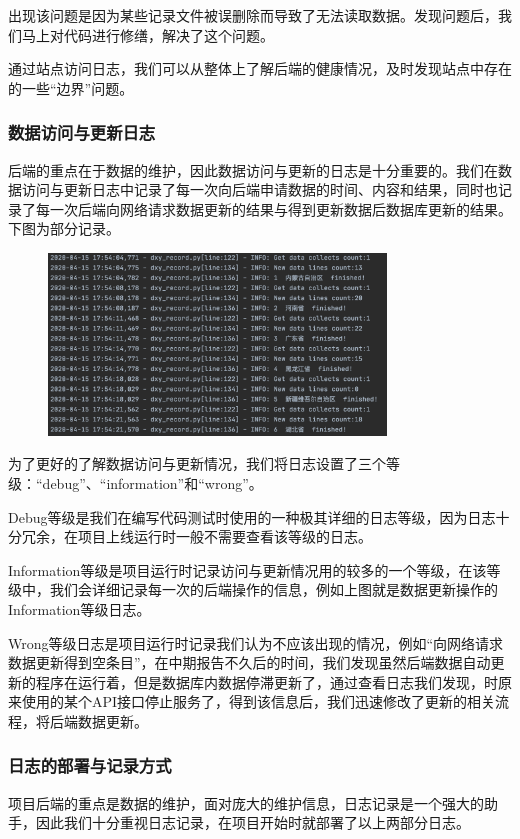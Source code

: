 \documentclass{article}
\begin{document}
出现该问题是因为某些记录文件被误删除而导致了无法读取数据。发现问题后，我们马上对代码进行修缮，解决了这个问题。

通过站点访问日志，我们可以从整体上了解后端的健康情况，及时发现站点中存在的一些“边界”问题。

\subsubsection{数据访问与更新日志}
后端的重点在于数据的维护，因此数据访问与更新的日志是十分重要的。我们在数据访问与更新日志中记录了每一次向后端申请数据的时间、内容和结果，同时也记录了每一次后端向网络请求数据更新的结果与得到更新数据后数据库更新的结果。下图为部分记录。

\begin{figure}[H]
\centering
\includegraphics[width=0.8\textwidth]{pic4.png}
\end{figure}

为了更好的了解数据访问与更新情况，我们将日志设置了三个等级：“debug”、“information”和“wrong”。

Debug等级是我们在编写代码测试时使用的一种极其详细的日志等级，因为日志十分冗余，在项目上线运行时一般不需要查看该等级的日志。

Information等级是项目运行时记录访问与更新情况用的较多的一个等级，在该等级中，我们会详细记录每一次的后端操作的信息，例如上图就是数据更新操作的Information等级日志。

Wrong等级日志是项目运行时记录我们认为不应该出现的情况，例如“向网络请求数据更新得到空条目”，在中期报告不久后的时间，我们发现虽然后端数据自动更新的程序在运行着，但是数据库内数据停滞更新了，通过查看日志我们发现，时原来使用的某个API接口停止服务了，得到该信息后，我们迅速修改了更新的相关流程，将后端数据更新。


\subsubsection{日志的部署与记录方式}
项目后端的重点是数据的维护，面对庞大的维护信息，日志记录是一个强大的助手，因此我们十分重视日志记录，在项目开始时就部署了以上两部分日志。
\end{document}
